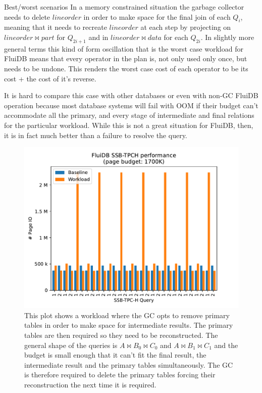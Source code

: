 \begin{corrected}{Best/worst scenarios}
  In a memory constrained situation the garbage collector needs to
  delete \(lineorder\) in order to make space for the final join of each
  \(Q_i\), meaning that it needs to recreate \(lineorder\) at each step
  by projecting on \(lineorder \Join part\) for \(Q_{2i + 1}\) and in
  \(lineorder \Join data\) for each \(Q_{2i}\). In slightly more general
  terms this kind of form oscillation that is the worst case workload
  for FluiDB means that every operator in the plan is, not only used
  only once, but needs to be undone. This renders the worst case cost of
  each operator to be its cost + the cost of it's reverse.

  It is hard to compare this case with other databases or even with
  non-GC FluiDB operation because most database systems will fail with
  OOM if their budget can't accommodate all the primary, and every stage
  of intermediate and final relations for the particular workload. While
  this is not a great situation for FluiDB, then, it is in fact much
  better than a failure to resolve the query.

  \begin{figure}[H]
    \centering
    \includegraphics[width=.9\linewidth]{./plans/workload_1700K.pdf}
    \caption{\label{fig:gc_enemy}This plot shows a workload where the GC
      opts to remove primary tables in order to make space for
      intermediate results. The primary tables are then required so they
      need to be reconstructed. The general shape of the queries is
      \(A \Join B_0 \Join C_0\) and \(A \Join B_1 \Join C_1\) and the
      budget is small enough that it can't fit the final result, the
      intermediate result and the primary tables simultaneously. The GC
      is therefore required to delete the primary tables forcing their
      reconstruction the next time it is required.}
  \end{figure}
\end{corrected}


